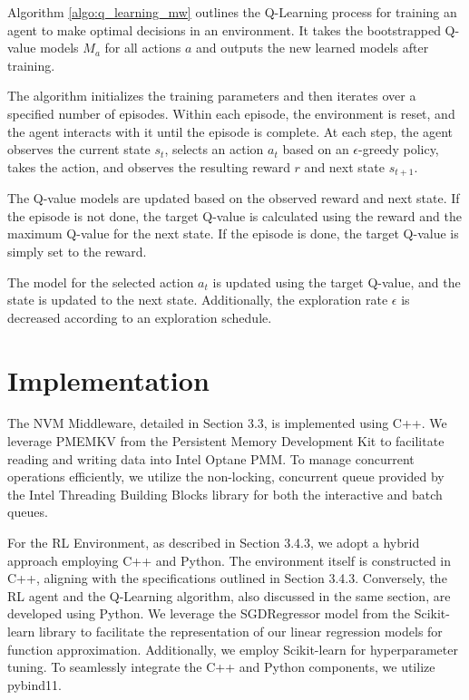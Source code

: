 Algorithm \ref{algo:q_learning_mw} outlines the Q-Learning process for training an agent to make optimal decisions in an environment. It takes the bootstrapped Q-value models $M_a$ for all actions $a$ and outputs the new learned models after training.

The algorithm initializes the training parameters and then iterates over a specified number of episodes. Within each episode, the environment is reset, and the agent interacts with it until the episode is complete. At each step, the agent observes the current state $s_t$, selects an action $a_t$ based on an $\epsilon$-greedy policy, takes the action, and observes the resulting reward $r$ and next state $s_{t+1}$.

The Q-value models are updated based on the observed reward and next state. If the episode is not done, the target Q-value is calculated using the reward and the maximum Q-value for the next state. If the episode is done, the target Q-value is simply set to the reward.

The model for the selected action $a_t$ is updated using the target Q-value, and the state is updated to the next state. Additionally, the exploration rate $\epsilon$ is decreased according to an exploration schedule.

\section{Implementation}

The NVM Middleware, detailed in Section 3.3, is implemented using C++. We leverage PMEMKV from the Persistent Memory Development Kit \cite{scargall2020pmem} to facilitate reading and writing data into Intel Optane PMM. To manage concurrent operations efficiently, we utilize the non-locking, concurrent queue provided by the Intel Threading Building Blocks \cite{tbb:online} library for both the interactive and batch queues.

For the RL Environment, as described in Section 3.4.3, we adopt a hybrid approach employing C++ and Python. The environment itself is constructed in C++, aligning with the specifications outlined in Section 3.4.3. Conversely, the RL agent and the Q-Learning algorithm, also discussed in the same section, are developed using Python. We leverage the SGDRegressor model from the Scikit-learn\cite{scikitle61:online} library to facilitate the representation of our linear regression models for function approximation. Additionally, we employ Scikit-learn for hyperparameter tuning. To seamlessly integrate the C++ and Python components, we utilize pybind11\cite{pybind1111:online}.